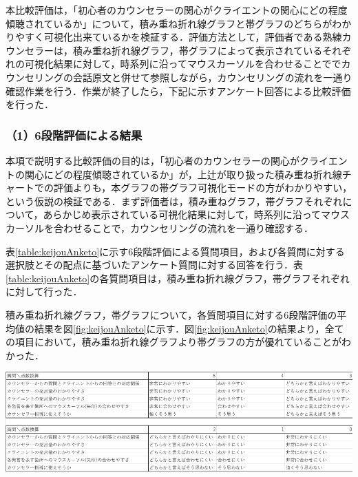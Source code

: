 \documentclass[shuuron]{kuee}
\begin{document}
本比較評価は，「初心者のカウンセラーの関心がクライエントの関心にどの程度傾聴されているか」について，積み重ね折れ線グラフと帯グラフのどちらがわかりやすく可視化出来ているかを検証する．評価方法として，評価者である熟練カウンセラーは，積み重ね折れ線グラフ，帯グラフによって表示されているそれぞれの可視化結果に対して，時系列に沿ってマウスカーソルを合わせることででカウンセリングの会話原文と併せて参照しながら，カウンセリングの流れを一通り確認作業を行う．作業が終了したら，下記に示すアンケート回答による比較評価を行った．

\subsubsection{（1）6段階評価による結果}

本項で説明する比較評価の目的は，「初心者のカウンセラーの関心がクライエントの関心にどの程度傾聴されているか」が，上辻\cite{uetsuji}が取り扱った積み重ね折れ線チャートでの評価よりも，本グラフの帯グラフ可視化モードの方がわかりやすい，という仮説の検証である．まず評価者は，積み重ねグラフ，帯グラフそれぞれについて，あらかじめ表示されている可視化結果に対して，時系列に沿ってマウスカーソルを合わせることで，カウンセリングの流れを一通り確認する．

表\ref{table:keijouAnketo}に示す6段階評価による質問項目，および各質問に対する選択肢とその配点に基づいたアンケート質問に対する回答を行う．表\ref{table:keijouAnketo}の各質問項目は，積み重ね折れ線グラフ，帯グラフそれぞれに対して行った．


積み重ね折れ線グラフ，帯グラフについて，各質問項目に対する6段階評価の平均値の結果を図\ref{fig:keijouAnketo}に示す．図\ref{fig:keijouAnketo}の結果より，全ての項目において，積み重ね折れ線グラフより帯グラフの方が優れていることがわかった．

\begin{table}
  \caption{可視化手法比較アンケートにおける6段階評価質問}
  \label{table:keijouAnketo}
  \begin{center}
    \includegraphics[width=\linewidth]{point.png}
  \end{center}
\end{table}
\end{document}
